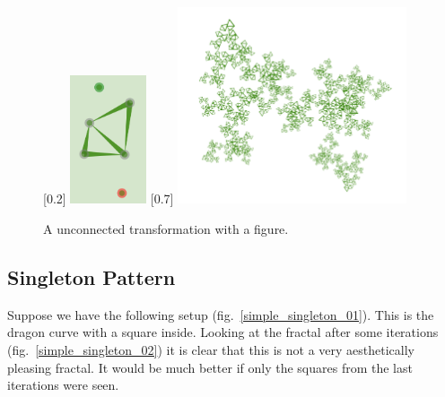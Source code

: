         \begin{figure}[ht]
            \caption{\label{simple_un_quad_01} A unconnected transformation with a figure.}
            \centering
            \subcaptionbox{}[0.2\textwidth]
                {\includegraphics[width=0.2\textwidth]{img/Simple_Techniques/Unconnect/simple_un_setup_quad_01.png}}
            \subcaptionbox{}[0.7\textwidth]
                {\includegraphics[width=0.6\textwidth]{img/Simple_Techniques/Unconnect/simple_un_quad_01.png}}
        \end{figure}

        \FloatBarrier

    \subsection{Singleton Pattern}

        Suppose we have the following setup (fig.~\ref{simple_singleton_01}).
        This is the dragon curve with a square inside.
        Looking at the fractal after some iterations (fig.~\ref{simple_singleton_02}) it is clear that this is not a very aesthetically pleasing fractal.
        It would be much better if only the squares from the last iterations were seen.

